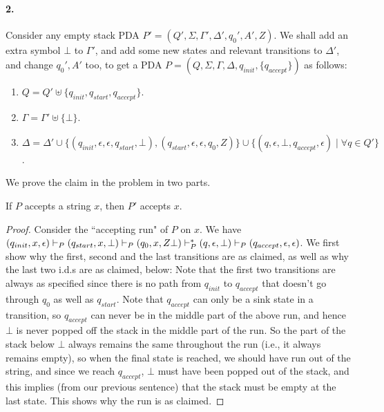\begin{soln}
    \paragraph{2.} Consider any empty stack PDA $P' = (Q', \Sigma, \Gamma', \Delta', q_0', A', Z)$. We shall add an extra symbol $\bot$ to $\Gamma'$, and add some new states and relevant transitions to $\Delta'$, and
    change $q_0', A'$ too, to get a PDA $P = (Q, \Sigma, \Gamma, \Delta, q_{init}, \{q_{accept}\})$ as follows:
    \begin{enumerate}
        \item $Q = Q' \uplus \{q_{init}, q_{start}, q_{accept}\}$.
        \item $\Gamma = \Gamma' \uplus \{\bot\}$.
        \item $\Delta = \Delta' \cup \{(q_{init}, \epsilon, \epsilon, q_{start}, \bot), (q_{start}, \epsilon, \epsilon, q_0, Z)\} \cup \{(q, \epsilon, \bot, q_{accept}, \epsilon) \mid \forall q \in Q'\}$.%
    \end{enumerate}
    We prove the claim in the problem in two parts.\nl
    \begin{claim}
        If $P$ accepts a string $x$, then $P'$ accepts $x$.
    \end{claim}
    \begin{proof}
        Consider the ``accepting run" of $P$ on $x$. We have $(q_{init}, x, \epsilon) \vdash_{P} (q_{start}, x, \bot) \vdash_{P} (q_0, x, Z\bot) \vdash_{P}^* (q, \epsilon, \bot) \vdash_{P} (q_{accept}, \epsilon, \epsilon)$.\nl
        We first show why the first, second and the last transitions are as claimed, as well as why the last two i.d.s are as claimed, below:\nl
        Note that the first two transitions are always as specified since there is no path from $q_{init}$ to $q_{accept}$ that doesn't go through $q_0$ as well as $q_{start}$.\nl
        Note that $q_{accept}$ can only be a sink state in a transition, so $q_{accept}$ can never be in the middle part of
        the above run, and hence $\bot$ is never popped off the stack in the middle part of the run. So the part of the stack below $\bot$ always remains the same throughout the run (i.e., it always
        remains empty), so when the final state is reached, we should have run out of the string, and since we reach $q_{accept}$, $\bot$ must have been popped out of the stack, and this
        implies (from our previous sentence) that the stack must be empty at the last state. This shows why the run is as claimed.\nl

\end{proof}
\end{soln}
